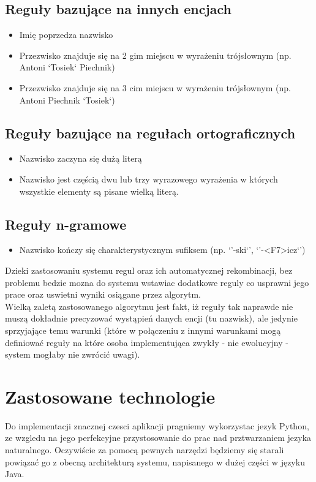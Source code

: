 \documentclass[12pt]{article}
\begin{document}
\subsection {Reguły bazujące na innych encjach}
\begin{itemize}
\item Imię poprzedza nazwisko
\item Przezwisko znajduje się na 2 gim miejscu w wyrażeniu trójsłownym (np. Antoni `Tosiek` Piechnik)
\item Przezwisko znajduje się na 3 cim miejscu w wyrażeniu trójsłownym (np. Antoni Piechnik `Tosiek`)
\end{itemize}
\subsection {Reguły bazujące na regułach ortograficznych }
\begin{itemize}
\item Nazwisko zaczyna się dużą literą
\item Nazwisko jest częścią dwu lub trzy wyrazowego wyrażenia w których wszystkie elementy są pisane wielką literą.
\end{itemize}
\subsection {Reguły n-gramowe}
\begin{itemize}
\item Nazwisko kończy się charakterystycznym sufiksem (np. `'-ski`', `'-<F7>icz`')
\end{itemize}
Dzieki zastosowaniu systemu regul oraz ich automatycznej rekombinacji, bez problemu bedzie mozna do systemu wstawiac dodatkowe reguly co usprawni jego prace oraz uswietni wyniki osiągane przez algorytm.
\\Wielką zaletą zastosowanego algorytmu jest fakt, iż reguły tak naprawde nie muszą dokładnie precyzować wystąpień danych encji (tu nazwisk), ale jedynie sprzyjające temu warunki (które w połączeniu z innymi warunkami mogą definiować reguły na które osoba implementująca zwykły - nie ewolucyjny - system mogłaby nie zwrócić uwagi).

\section{Zastosowane technologie}
Do implementacji znacznej czesci aplikacji pragniemy wykorzystac jezyk Python, ze wzgledu na jego perfekcyjne przystosowanie do prac nad prztwarzaniem jezyka naturalnego.
Oczywiście za pomocą pewnych narzędzi będziemy się starali powiązać go z obecną architekturą systemu, napisanego w dużej części w języku Java.
\end{document}
